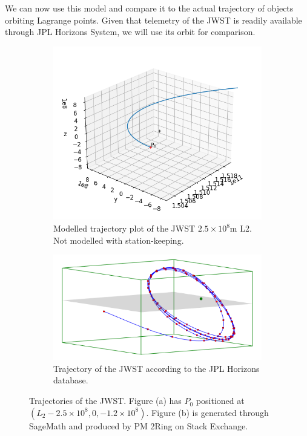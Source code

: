 We can now use this model and compare it to the actual trajectory of objects orbiting Lagrange points.
Given that telemetry of the JWST is readily available through JPL Horizons System, we will use its orbit for comparison.
\begin{figure}[H]
	\centering
	\captionsetup[subfigure]{justification=centering}
	\begin{subfigure}[b]{0.4\textwidth}
		\centering
		\includegraphics[scale=0.46]{figures/xyzplot3.png}
		\caption{Modelled trajectory plot of the JWST $2.5\times10^8\si{\metre}$ L2. Not modelled with station-keeping.}
		\label{fig:3dplot3}
	\end{subfigure}
	\qquad
	\begin{subfigure}[b]{0.4\textwidth}
		\centering
		\includegraphics[scale=0.2]{figures/xyjwstplot.png}
		\vspace*{1em}
		\caption{Trajectory of the JWST according to the JPL Horizons database.}
		\label{fig:3dplot4}
		\vspace*{1em}
	\end{subfigure}
	\caption{Trajectories of the JWST. Figure (a) has $P_0$ positioned at $(L_2 - 2.5\times10^8, 0, - 1.2\times10^8)$. Figure (b) is generated through SageMath and produced by PM 2Ring on Stack Exchange.}
\end{figure}
